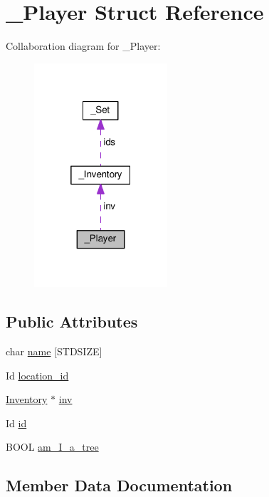\hypertarget{struct__Player}{}\section{\+\_\+\+Player Struct Reference}
\label{struct__Player}


Collaboration diagram for \+\_\+\+Player\+:\nopagebreak
\begin{figure}[H]
\begin{center}
\leavevmode
\includegraphics[width=140pt]{struct__Player__coll__graph}
\end{center}
\end{figure}
\subsection*{Public Attributes}
\begin{DoxyCompactItemize}
\item 
char \hyperlink{struct__Player_abd3fbad9568ff1e608654d58e71b8c58}{name} \mbox{[}S\+T\+D\+S\+I\+ZE\mbox{]}
\item 
Id \hyperlink{struct__Player_aca2cb83e7a18dea36c33ad94e36a1e54}{location\+\_\+id}
\item 
\hyperlink{struct__Inventory}{Inventory} $\ast$ \hyperlink{struct__Player_aaaeeb03326c37ce62c333c2b94fde23c}{inv}
\item 
Id \hyperlink{struct__Player_a60d635cd063816a9c1bd873f4868bb90}{id}
\item 
B\+O\+OL \hyperlink{struct__Player_af9e176743e2b62576d0344f35cb95d2e}{am\+\_\+\+I\+\_\+a\+\_\+tree}
\end{DoxyCompactItemize}


\subsection{Member Data Documentation}
\mbox{\label{struct__Player_af9e176743e2b62576d0344f35cb95d2e}} 
